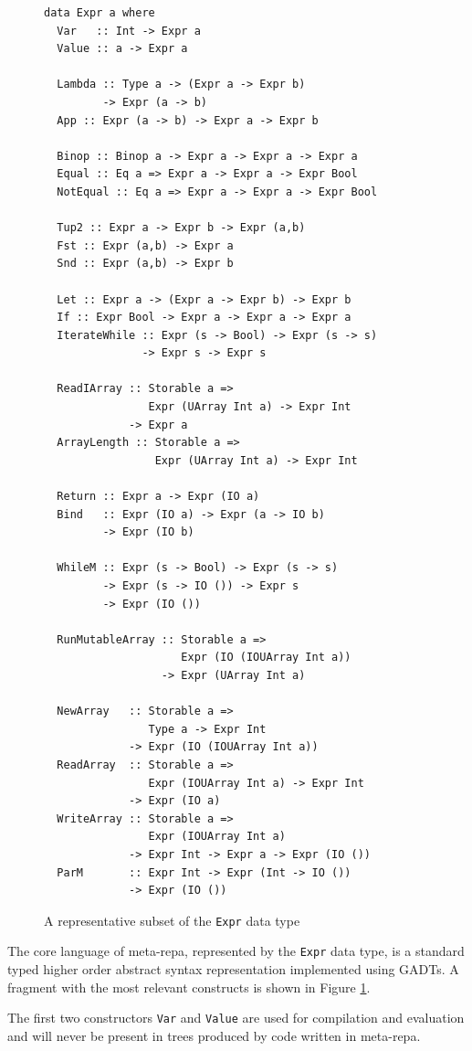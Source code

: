 \documentclass[preprint]{sigplanconf}
\begin{document}
\begin{figure}
\begin{verbatim}
data Expr a where
  Var   :: Int -> Expr a
  Value :: a -> Expr a

  Lambda :: Type a -> (Expr a -> Expr b)
         -> Expr (a -> b)
  App :: Expr (a -> b) -> Expr a -> Expr b

  Binop :: Binop a -> Expr a -> Expr a -> Expr a
  Equal :: Eq a => Expr a -> Expr a -> Expr Bool
  NotEqual :: Eq a => Expr a -> Expr a -> Expr Bool

  Tup2 :: Expr a -> Expr b -> Expr (a,b)
  Fst :: Expr (a,b) -> Expr a
  Snd :: Expr (a,b) -> Expr b

  Let :: Expr a -> (Expr a -> Expr b) -> Expr b
  If :: Expr Bool -> Expr a -> Expr a -> Expr a
  IterateWhile :: Expr (s -> Bool) -> Expr (s -> s)
               -> Expr s -> Expr s

  ReadIArray :: Storable a =>
                Expr (UArray Int a) -> Expr Int
             -> Expr a
  ArrayLength :: Storable a =>
                 Expr (UArray Int a) -> Expr Int

  Return :: Expr a -> Expr (IO a)
  Bind   :: Expr (IO a) -> Expr (a -> IO b)
         -> Expr (IO b)

  WhileM :: Expr (s -> Bool) -> Expr (s -> s)
         -> Expr (s -> IO ()) -> Expr s
         -> Expr (IO ())

  RunMutableArray :: Storable a =>
                     Expr (IO (IOUArray Int a))
                  -> Expr (UArray Int a)

  NewArray   :: Storable a =>
                Type a -> Expr Int
             -> Expr (IO (IOUArray Int a))
  ReadArray  :: Storable a =>
                Expr (IOUArray Int a) -> Expr Int
             -> Expr (IO a)
  WriteArray :: Storable a =>
                Expr (IOUArray Int a)
             -> Expr Int -> Expr a -> Expr (IO ())
  ParM       :: Expr Int -> Expr (Int -> IO ())
             -> Expr (IO ())
\end{verbatim}
\caption{A representative subset of the \texttt{Expr} data type}
\label{fig:expr}
\end{figure}

The core language of meta-repa, represented by the \texttt{Expr} data
type, is a standard typed higher order abstract syntax representation
implemented using GADTs. A fragment with the most relevant constructs is
shown in Figure \ref{fig:expr}.

The first two constructors \texttt{Var} and \texttt{Value} are used for
compilation and evaluation and will never be present in trees produced
by code written in meta-repa.
\end{document}
